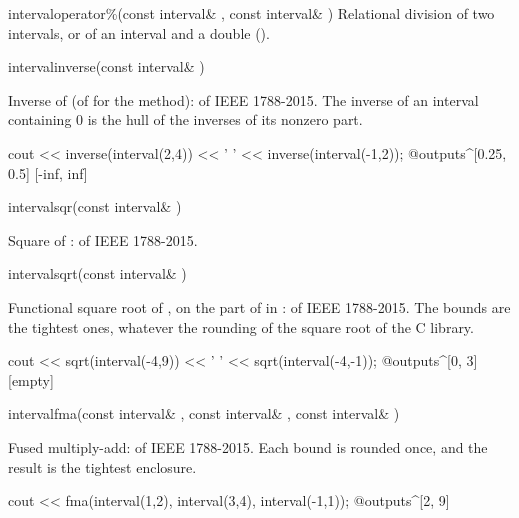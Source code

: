\documentclass[12pt,a4paper,twoside,openright]{book}
\begin{document}
\begin{deffun}{interval}{operator\%}{(const interval\& , const interval\& )}
  Relational division of two intervals, or of an interval and a double
  ().
\end{deffun}

\begin{deffun}{interval}{inverse}{(const interval\& )}
  \begin{operation}
  \end{operation}
  Inverse of  (of  for the method):  of
  IEEE 1788-2015. The inverse of an interval containing 0 is the hull of the
  inverses of its nonzero part.
\begin{example}
cout << inverse(interval(2,4)) << ' ' << inverse(interval(-1,2));
@outputs^[0.25, 0.5] [-inf, inf]~
\end{example}
\end{deffun}

\begin{deffun}{interval}{sqr}{(const interval\& )}
  \begin{operation}
  \end{operation}
  Square of :  of IEEE 1788-2015.
\end{deffun}

\begin{deffun}{interval}{sqrt}{(const interval\& )}
  \begin{operation}
  \end{operation}
  Functional square root of , on the part of  in
  :  of IEEE 1788-2015. The bounds are the
  tightest ones, whatever the rounding of the square root of the C
  library.\newinvfive
\begin{example}
cout << sqrt(interval(-4,9)) << ' ' << sqrt(interval(-4,-1));
@outputs^[0, 3] [empty]~
\end{example}
\end{deffun}

\begin{deffun}{interval}{fma}{(const interval\& , const interval\& , const interval\& )}
  \begin{operation}
  \end{operation}
  Fused multiply-add:  of IEEE 1788-2015. Each bound is rounded
  once, and the result is the tightest enclosure.\newinvfive
\begin{example}
cout << fma(interval(1,2), interval(3,4), interval(-1,1));
@outputs^[2, 9]~
\end{example}
\end{deffun}
\end{document}
